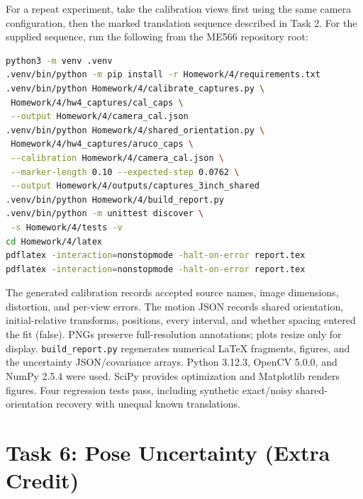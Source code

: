 \documentclass[conference,letterpaper]{IEEEtran}
\newcommand{\code}[1]{\nolinkurl{#1}}
\begin{document}
For a repeat experiment, take the calibration views first using the same camera configuration, then the marked translation sequence described in Task 2. For the supplied sequence, run the following from the ME566 repository root:
\begin{lstlisting}[language=bash]
python3 -m venv .venv
.venv/bin/python -m pip install -r Homework/4/requirements.txt
.venv/bin/python Homework/4/calibrate_captures.py \
 Homework/4/hw4_captures/cal_caps \
 --output Homework/4/camera_cal.json
.venv/bin/python Homework/4/shared_orientation.py \
 Homework/4/hw4_captures/aruco_caps \
 --calibration Homework/4/camera_cal.json \
 --marker-length 0.10 --expected-step 0.0762 \
 --output Homework/4/outputs/captures_3inch_shared
.venv/bin/python Homework/4/build_report.py
.venv/bin/python -m unittest discover \
 -s Homework/4/tests -v
cd Homework/4/latex
pdflatex -interaction=nonstopmode -halt-on-error report.tex
pdflatex -interaction=nonstopmode -halt-on-error report.tex
\end{lstlisting}
The generated calibration records accepted source names, image dimensions, distortion, and per-view errors. The motion JSON records shared orientation, initial-relative transforms, positions, every interval, and whether spacing entered the fit (false). PNGs preserve full-resolution annotations; plots resize only for display. \code{build_report.py} regenerates numerical LaTeX fragments, figures, and the uncertainty JSON/covariance arrays. Python 3.12.3, OpenCV 5.0.0, and NumPy 2.5.4 were used. SciPy provides optimization and Matplotlib renders figures. Four regression tests pass, including synthetic exact/noisy shared-orientation recovery with unequal known translations.

\section{Task 6: Pose Uncertainty (Extra Credit)}
\end{document}
